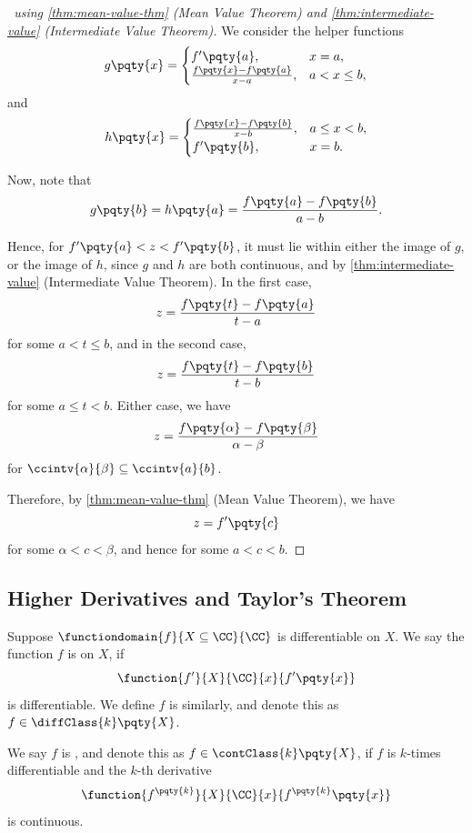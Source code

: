 \begin{proof}[\proofname\ using \autoref{thm:mean-value-thm} (Mean Value Theorem) and \autoref{thm:intermediate-value} (Intermediate Value Theorem)]
    We consider the helper functions
    \[
        g\pqty{x} = \begin{cases}
            f'\pqty{a}, & x = a, \\
            \frac{f\pqty{x} - f\pqty{a}}{x - a}, & a < x \leq b,
        \end{cases}
    \]
    and
    \[
        h\pqty{x} = \begin{cases}
            \frac{f\pqty{x} - f\pqty{b}}{x - b}, & a \leq x < b, \\
            f'\pqty{b}, & x = b.
        \end{cases}
    \]

    Now, note that
    \[
        g\pqty{b} = h\pqty{a} = \frac{f\pqty{a} - f\pqty{b}}{a - b}.
    \]

    Hence, for \(f'\pqty{a} < z < f'\pqty{b}\), it must lie within either the image of \(g\), or the image of \(h\), since \(g\) and \(h\) are both continuous, and by \autoref{thm:intermediate-value} (Intermediate Value Theorem). In the first case,
    \[
        z = \frac{f\pqty{t} - f\pqty{a}}{t - a}
    \]
    for some \(a < t \leq b\), and in the second case,
    \[
        z = \frac{f\pqty{t} - f\pqty{b}}{t - b}
    \]  
    for some \(a \leq t < b\). Either case, we have
    \[
        z = \frac{f\pqty{\alpha} - f\pqty{\beta}}{\alpha - \beta}
    \]
    for \(\ccintv{\alpha}{\beta} \subseteq \ccintv{a}{b}\).

    Therefore, by \autoref{thm:mean-value-thm} (Mean Value Theorem), we have
    \[
        z = f' \pqty{c}  
    \]
    for some \(\alpha < c < \beta\), and hence for some \(a < c < b\).
\end{proof}

\subsection{Higher Derivatives and Taylor's Theorem}
\begin{definition}
    \label{def:higher-order-derivatives}%
    Suppose \(\functiondomain{f}{X \subseteq \CC}{\CC}\) is differentiable on \(X\). We say the function \(f\) is  on \(X\), if
    \[
        \function{f'}{X}{\CC}{x}{f'\pqty{x}}
    \]
    is differentiable. We define \(f\) is  similarly, and denote this as \(f \in \diffClass{k} \pqty{X}\).

    We say \(f\) is , and denote this as \(f \in \contClass{k} \pqty{X}\), if \(f\) is \(k\)-times differentiable and the \(k\)-th derivative
    \[
        \function{f^{\pqty{k}}}{X}{\CC}{x}{f^{\pqty{k}}\pqty{x}}
    \]
    is continuous.
\end{definition}

